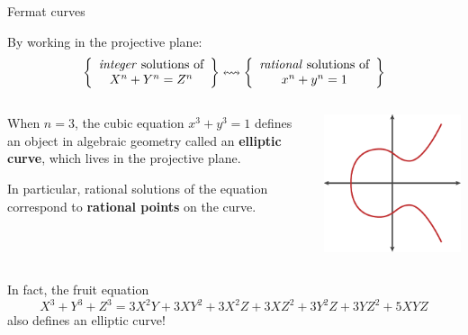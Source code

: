 \documentclass[10pt]{beamer}
\theoremstyle{definition}
\begin{document}
\begin{frame}[t]{Fermat curves}

By working in the projective plane:
$$ \left\{\begin{array}{c} \text{\emph{integer} solutions of} \\ X^n + Y^n = Z^n \end{array}\right\} \leftrightsquigarrow \left\{\begin{array}{c} \text{\emph{rational} solutions of} \\ x^n + y^n = 1 \end{array}\right\} $$

\vspace{0.5cm}

\begin{columns}[T]

\begin{column}{0.7\textwidth}
When $ n = 3 $, the cubic equation $ x^3 + y^3 = 1 $ defines an object in algebraic geometry called an \textbf{elliptic curve}, which lives in the projective plane.

\vspace{0.5cm} In particular, rational solutions of the equation correspond to \textbf{rational points} on the curve.
\end{column}

\begin{column}{0.2\textwidth}
\hspace{-1cm}
\includegraphics[width=1.2\textwidth]{ellipticcurve.png}
\end{column}

\end{columns}

\vspace{0.5cm} In fact, the fruit equation
$$ X^3 + Y^3 + Z^3 = 3X^2Y + 3XY^2 + 3X^2Z + 3XZ^2 + 3Y^2Z + 3YZ^2 + 5XYZ $$
also defines an elliptic curve!

\end{frame}
\end{document}
